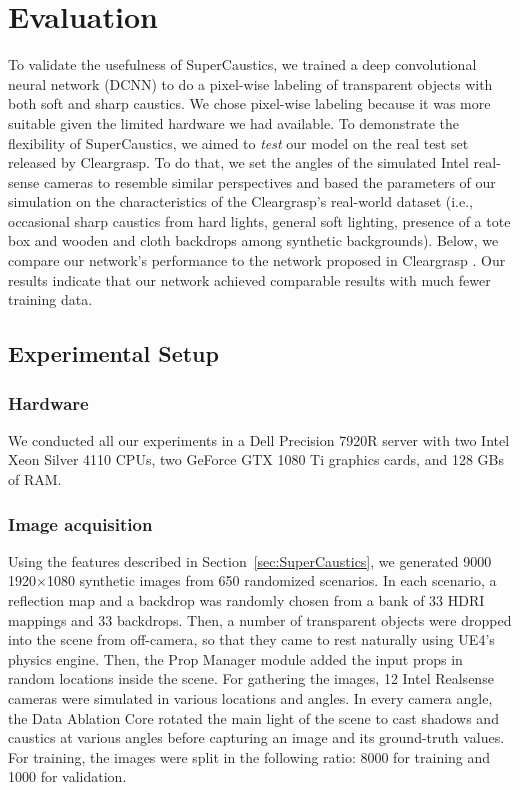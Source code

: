 \documentclass[conference]{IEEEtran}
\begin{document}
\section{Evaluation}
To validate the usefulness of SuperCaustics, we trained a deep convolutional neural network (DCNN) to do a pixel-wise labeling of transparent objects with both soft and sharp caustics. We chose pixel-wise labeling because it was more suitable given the limited hardware we had available. To demonstrate the flexibility of SuperCaustics, we aimed to \textit{test} our model on the real test set released by Cleargrasp. To do that, we set the angles of the simulated Intel real-sense cameras to resemble similar perspectives and based the parameters of our simulation on the characteristics of the Cleargrasp's real-world dataset (i.e., occasional sharp caustics from hard lights, general soft lighting, presence of a tote box and wooden and cloth backdrops among synthetic backgrounds). Below, we compare our network's performance to the network proposed in Cleargrasp \cite{cleargrasp}. Our results indicate that our network achieved comparable results with much fewer training data.



\subsection{Experimental Setup}

\subsubsection{Hardware} We conducted all our experiments in a Dell Precision 7920R server with  two  Intel  Xeon  Silver  4110  CPUs,  two  GeForce  GTX  1080  Ti  graphics cards, and 128 GBs of RAM.

\subsubsection{Image acquisition} Using the features described in Section~\ref{sec:SuperCaustics}, we generated 9000 1920$\times$1080 synthetic images from 650 randomized scenarios. In each scenario, a reflection map and a backdrop was randomly chosen from a bank of 33 HDRI mappings and 33 backdrops. Then, a number of transparent objects were dropped into the scene from off-camera, so that they came to rest naturally using UE4's physics engine. Then, the Prop Manager module added the input props in random locations inside the scene. For gathering the images, 12 Intel Realsense cameras were simulated in various locations and angles. In every camera angle, the Data Ablation Core rotated the main light of the scene to cast shadows and caustics at various angles before capturing an image and its ground-truth values. For training, the images were split in the following ratio: 8000 for training and 1000 for validation.
\end{document}
